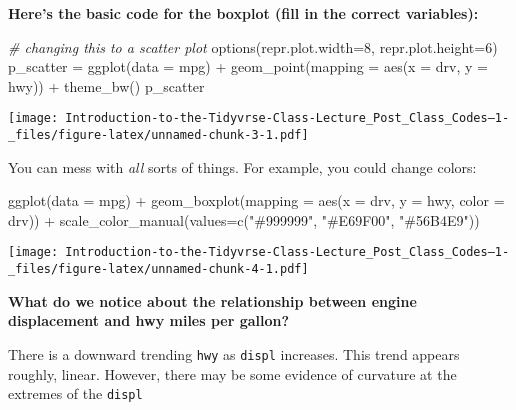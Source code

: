 \documentclass[
]{article}
\newenvironment{Shaded}{\begin{snugshade}}{\end{snugshade}}
\newcommand{\AttributeTok}[1]{\textcolor[rgb]{0.77,0.63,0.00}{#1}}
\newcommand{\CommentTok}[1]{\textcolor[rgb]{0.56,0.35,0.01}{\textit{#1}}}
\newcommand{\DecValTok}[1]{\textcolor[rgb]{0.00,0.00,0.81}{#1}}
\newcommand{\FunctionTok}[1]{\textcolor[rgb]{0.00,0.00,0.00}{#1}}
\newcommand{\NormalTok}[1]{#1}
\newcommand{\OtherTok}[1]{\textcolor[rgb]{0.56,0.35,0.01}{#1}}
\newcommand{\SpecialCharTok}[1]{\textcolor[rgb]{0.00,0.00,0.00}{#1}}
\newcommand{\StringTok}[1]{\textcolor[rgb]{0.31,0.60,0.02}{#1}}
\begin{document}
\textbf{Here's the basic code for the boxplot (fill in the correct
variables):}

\begin{Shaded}
\begin{Highlighting}[]
\CommentTok{\# changing this to a scatter plot }
\FunctionTok{options}\NormalTok{(}\AttributeTok{repr.plot.width=}\DecValTok{8}\NormalTok{, }\AttributeTok{repr.plot.height=}\DecValTok{6}\NormalTok{)}
\NormalTok{p\_scatter }\OtherTok{=} \FunctionTok{ggplot}\NormalTok{(}\AttributeTok{data =}\NormalTok{ mpg) }\SpecialCharTok{+} 
  \FunctionTok{geom\_point}\NormalTok{(}\AttributeTok{mapping =} \FunctionTok{aes}\NormalTok{(}\AttributeTok{x =}\NormalTok{ drv, }\AttributeTok{y =}\NormalTok{ hwy)) }\SpecialCharTok{+} 
  \FunctionTok{theme\_bw}\NormalTok{()}
\NormalTok{p\_scatter}
\end{Highlighting}
\end{Shaded}

\texttt{[image: Introduction-to-the-Tidyvrse-Class-Lecture\_Post\_Class\_Codes--1-\_files/figure-latex/unnamed-chunk-3-1.pdf]}

You can mess with \emph{all} sorts of things. For example, you could
change colors:

\begin{Shaded}
\begin{Highlighting}[]
\FunctionTok{ggplot}\NormalTok{(}\AttributeTok{data =}\NormalTok{ mpg) }\SpecialCharTok{+} 
  \FunctionTok{geom\_boxplot}\NormalTok{(}\AttributeTok{mapping =} \FunctionTok{aes}\NormalTok{(}\AttributeTok{x =}\NormalTok{ drv, }\AttributeTok{y =}\NormalTok{ hwy, }\AttributeTok{color =}\NormalTok{ drv)) }\SpecialCharTok{+} 
\FunctionTok{scale\_color\_manual}\NormalTok{(}\AttributeTok{values=}\FunctionTok{c}\NormalTok{(}\StringTok{"\#999999"}\NormalTok{, }\StringTok{"\#E69F00"}\NormalTok{, }\StringTok{"\#56B4E9"}\NormalTok{))}
\end{Highlighting}
\end{Shaded}

\texttt{[image: Introduction-to-the-Tidyvrse-Class-Lecture\_Post\_Class\_Codes--1-\_files/figure-latex/unnamed-chunk-4-1.pdf]}

\textbf{What do we notice about the relationship between engine
displacement and hwy miles per gallon?}

There is a downward trending \texttt{hwy} as \texttt{displ} increases.
This trend appears roughly, linear. However, there may be some evidence
of curvature at the extremes of the \texttt{displ}
\end{document}
